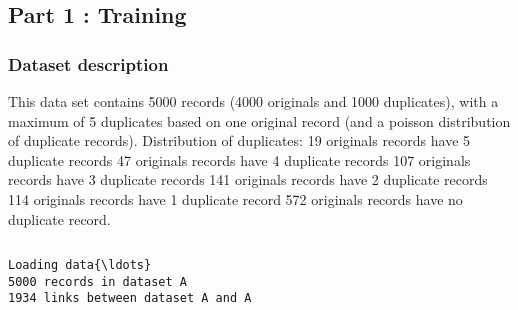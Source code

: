 \documentclass{article}
\begin{document}
\hypertarget{part-1-training}{%
\subsection{Part 1 : Training}\label{part-1-training}}

\hypertarget{dataset-description}{%
\subsubsection{Dataset description}\label{dataset-description}}

This data set contains 5000 records (4000 originals and 1000
duplicates), with a maximum of 5 duplicates based on one original record
(and a poisson distribution of duplicate records). Distribution of
duplicates: 19 originals records have 5 duplicate records 47 originals
records have 4 duplicate records 107 originals records have 3 duplicate
records 141 originals records have 2 duplicate records 114 originals
records have 1 duplicate record 572 originals records have no duplicate
record.

    \begin{Verbatim}[commandchars=\\\{\}]

\end{Verbatim}

    \begin{Verbatim}[commandchars=\\\{\}]
Loading data{\ldots}
5000 records in dataset A
1934 links between dataset A and A

    \end{Verbatim}
\end{document}
